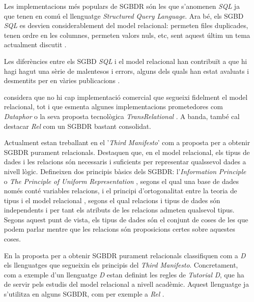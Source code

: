 Les implementacions més populars de SGBDR són les que s'anomenen
\emph{SQL} ja que tenen en comú el llenguatge \emph{Structured Query
  Language}. Ara bé, els SGBD \emph{SQL} es desvien considerablement
del model relacional: permeten files duplicades, tenen ordre en les
columnes, permeten valors nuls, etc, sent aquest últim un tema
actualment discutit \parencite{date08:nulls}.

Les diferències entre els SGBD \emph{SQL} i el model relacional han
contribuït a que hi hagi hagut una sèrie de malentesos i
errors, alguns dels quals han estat avaluats i desmentits per
\citeauthor{dbdebunk} en vàries
publicacions \parencite{dbdebunk,date06}.
  

\textcite[cap.~2]{date06} %
considera que no hi cap implementació comercial que segueixi fidelment
el model relacional, tot i que esmenta algunes implementacions
prometedores com \emph{Dataphor} o la seva proposta tecnològica
\emph{TransRelational} \parencite{date:transrelational}. A banda,
també cal destacar \emph{Rel} \parencite{rel} com un SGBDR bastant
consolidat.



Actualment \textcite{date:thethirdmanifesto} estan treballant en el
'\emph{Third Manifesto}' com a proposta per a obtenir SGBDR purament
relacionals. Destaquen que, en el model relacional, els tipus de dades
i les relacions són necessaris i suficients per representar qualssevol
dades a nivell lògic. %
Defineixen dos principis bàsics dels SGBDR: l'\emph{Information
  Principle} o \emph{The Principle of Uniform
  Representation} \parencite{date:dictionary}, segons el qual una base
de dades només conté variables relacions, i el principi
d'ortogonalitat entre la teoria de tipus i el model
relacional \parencite[cap.~6]{date06}, segons el qual relacions i
tipus de dades són independents i per tant els atributs de les
relacions admeten qualsevol tipus.  Segons aquest punt de vista, els
tipus de dades són el conjunt de coses de les que podem parlar mentre que les
relacions són proposicions certes sobre aquestes coses.

En la proposta per a obtenir SGBDR purament relacionals
\textcite{date06:_datab_types_relat_model,date:tutoriald} classifiquen
com a \emph{D} els llenguatges que segueixin els principis del
\emph{Third Manifesto}. Concretament, com a exemple d'un llenguatge
\emph{D} estan definint les regles de \emph{Tutorial D}, que ha de
servir pels estudis del model relacional a nivell acadèmic. Aquest
llenguatge ja s'utilitza en alguns SGBDR, com per exemple a
\emph{Rel} \parencite{rel}.


